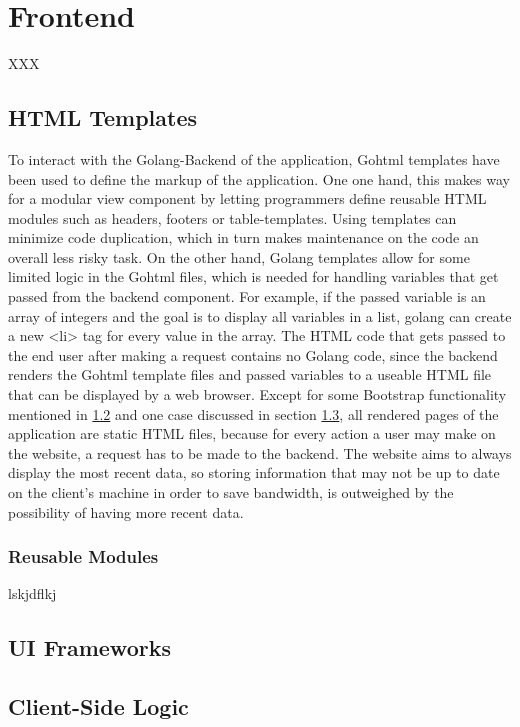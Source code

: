 \section{Frontend}
XXX
\subsection{HTML Templates}
To interact with the Golang-Backend of the application, Gohtml templates have been used to define the markup of the application. One one hand, this makes way for a modular view component by letting programmers define reusable HTML modules such as headers, footers or table-templates. Using templates can minimize code duplication, which in turn makes maintenance on the code an overall less risky task. On the other hand, Golang templates allow for some limited logic in the Gohtml files, which is needed for handling variables that get passed from the backend component. For example, if the passed variable is an array of integers and the goal is to display all variables in a list, golang can create a new <li> tag for every value in the array. The HTML code that gets passed to the end user after making a request contains no Golang code, since the backend renders the Gohtml template files and passed variables to a useable HTML file that can be displayed by a web browser. Except for some Bootstrap functionality mentioned in \ref{sec:uiframeworks} and one case discussed in section \ref{sec:clientside}, all rendered pages of the application are static HTML files, because for every action a user may make on the website, a request has to be made to the backend. The website aims to always display the most recent data, so storing information that may not be up to date on the client's machine in order to save bandwidth, is outweighed by the possibility of having more recent data. 

\subsubsection{Reusable Modules}
lskjdflkj
\subsection{UI Frameworks} \label{sec:uiframeworks}
\subsection{Client-Side Logic} \label{sec:clientside}